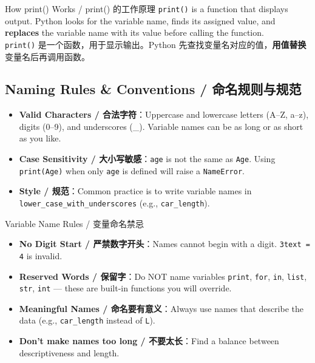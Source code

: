 \documentclass[11pt,a4paper]{article}
\begin{document}
\begin{concept}{How print() Works / print() 的工作原理}
    \texttt{print()} is a function that displays output. Python looks for the variable name, finds its assigned value, and \textbf{replaces} the variable name with its value before calling the function. \\
    \texttt{print()} 是一个函数，用于显示输出。Python 先查找变量名对应的值，\textbf{用值替换}变量名后再调用函数。
\end{concept}

\subsection{Naming Rules \& Conventions / 命名规则与规范}

\begin{itemize}[itemsep=0.3em]
    \item \textbf{Valid Characters / 合法字符}：Uppercase and lowercase letters (A–Z, a–z), digits (0–9), and underscores (\_). Variable names can be as long or as short as you like.
    \item \textbf{Case Sensitivity / 大小写敏感}：\texttt{age} is not the same as \texttt{Age}. Using \texttt{print(Age)} when only \texttt{age} is defined will raise a \texttt{NameError}.
    \item \textbf{Style / 规范}：Common practice is to write variable names in \texttt{lower\_case\_with\_underscores} (e.g., \texttt{car\_length}).
\end{itemize}

\begin{warning}{Variable Name Rules / 变量命名禁忌}
    \begin{itemize}
        \item \textbf{No Digit Start / 严禁数字开头}：Names cannot begin with a digit. \texttt{3text = 4} is invalid.
        \item \textbf{Reserved Words / 保留字}：Do NOT name variables \texttt{print}, \texttt{for}, \texttt{in}, \texttt{list}, \texttt{str}, \texttt{int} — these are built-in functions you will override.
        \item \textbf{Meaningful Names / 命名要有意义}：Always use names that describe the data (e.g., \texttt{car\_length} instead of \texttt{L}).
        \item \textbf{Don't make names too long / 不要太长}：Find a balance between descriptiveness and length.
    \end{itemize}
\end{warning}
\end{document}
